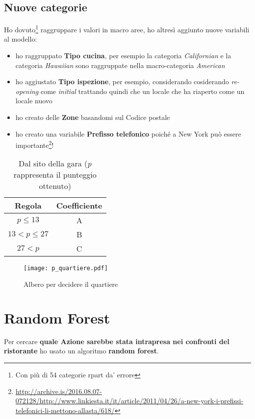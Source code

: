 \documentclass[10pt]{article}
\begin{document}
\subsection{Nuove categorie}
\label{sec:nuovecategorie}
Ho dovuto\footnote{Con più di 54 categorie rpart da' errore} raggruppare i valori in macro aree, ho altresì aggiunto nuove variabili al modello:
\begin{itemize}
\item ho raggruppato \textbf{Tipo cucina}, per esempio la categoria \emph{Californian} e la categoria \emph{Hawaiian} sono raggruppate nella macro-categoria \emph{American}
\item ho aggiustato \textbf{Tipo ispezione}, per esempio, considerando cosiderando \emph{re-opening} come \emph{initial} trattando quindi che un locale che ha riaperto come un locale nuovo
\item ho creato delle \textbf{Zone} basandomi sul Codice postale
\item ho creato una variabile \textbf{Prefisso telefonico} poiché a New York può essere importante\footnote{\url{http://archive.is/2016.08.07-072128/http://www.linkiesta.it/it/article/2011/04/26/a-new-york-i-prefissi-telefonici-li-mettono-allasta/618/}}!
\end{itemize}
\begin{table}[p!]
\centering
\begin{tabular}{| c | c |}
    \hline
    Regola & Coefficiente\\ \hline
\(p\leq13\)&A\\ \hline
\(13<p\leq27\)&B \\ \hline
\(27<p\)&C\\ \hline
\end{tabular}
\caption{Dal sito della gara (\emph{p} rappresenta il punteggio ottenuto)}
\label{tab:punteggi}
\end{table}

\begin{figure}[p!]
\centering
\texttt{[image: p\_quartiere.pdf]}
\caption{Albero per decidere il quartiere}
\label{fig:quartieretree}
\end{figure}

\section{Random Forest}
\label{sec:randomforest}
Per cercare \textbf{quale Azione sarebbe stata intrapresa nei confronti del ristorante} ho usato un algoritmo \textbf{random forest}.
\end{document}
